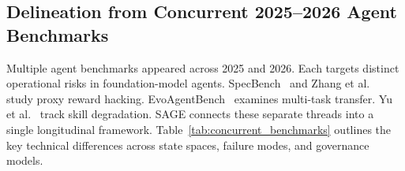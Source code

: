 \subsection{Delineation from Concurrent 2025--2026 Agent Benchmarks}
\label{sec:concurrent_studies}

Multiple agent benchmarks appeared across 2025 and 2026. Each targets distinct operational risks in foundation-model agents. SpecBench~\cite{zhao2026specbench} and Zhang et al.~\cite{zhang2026reward} study proxy reward hacking. EvoAgentBench~\cite{gao2026evoagentbench} examines multi-task transfer. Yu et al.~\cite{yu2026forgetting} track skill degradation. SAGE connects these separate threads into a single longitudinal framework. Table~\ref{tab:concurrent_benchmarks} outlines the key technical differences across state spaces, failure modes, and governance models.

